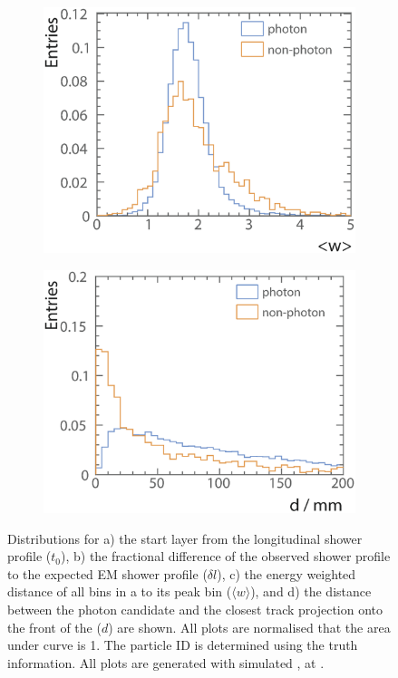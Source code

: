 \begin{figure}[tbph]
\begin{subfigure}[b]{0.45\textwidth}
    \includegraphics[width=\textwidth]{photon/likelihood/PeakRms2}
    \caption{}
    \label{fig:photonPeakRms}
  \end{subfigure}
  \begin{subfigure}[b]{0.45\textwidth}
    \includegraphics[width=\textwidth]{photon/likelihood/MinDistanceToTrack2}
    \caption{}
    \label{fig:photonMinDistanceToTrack}
  \end{subfigure}
\caption
{Distributions for a) the start layer from the longitudinal shower profile ($t_0$), b)  the fractional difference of the observed shower profile to the expected EM shower profile ($\delta{l}$), c) the energy weighted \rms distance of all bins in a \ShowerPeak to its peak bin ($\langle{w}\rangle$), and d) the distance between the photon candidate and the closest track projection onto the front of the \ECAL ($d$) are shown. All plots are normalised that the area under curve is 1. The particle ID is determined using the truth information. All plots are generated with  simulated \eeZuds, at .}
\label{fig:photonVarLikelihood}
\end{figure}



